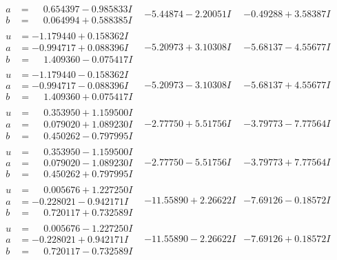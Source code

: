\documentclass[1p]{elsarticle_modified}
\theoremstyle{definition}
\begin{document}
$$\begin{array}{c|c|c}
\begin{aligned}
a &= \phantom{-}0.654397 - 0.985833 I \\
b &= \phantom{-}0.064994 + 0.588385 I\end{aligned}
 & -5.44874 - 2.20051 I & -0.49288 + 3.58387 I \\ \hline\begin{aligned}
u &= -1.179440 + 0.158362 I \\
a &= -0.994717 + 0.088396 I \\
b &= \phantom{-}1.409360 - 0.075417 I\end{aligned}
 & -5.20973 + 3.10308 I & -5.68137 - 4.55677 I \\ \hline\begin{aligned}
u &= -1.179440 - 0.158362 I \\
a &= -0.994717 - 0.088396 I \\
b &= \phantom{-}1.409360 + 0.075417 I\end{aligned}
 & -5.20973 - 3.10308 I & -5.68137 + 4.55677 I \\ \hline\begin{aligned}
u &= \phantom{-}0.353950 + 1.159500 I \\
a &= \phantom{-}0.079020 + 1.089230 I \\
b &= \phantom{-}0.450262 - 0.797995 I\end{aligned}
 & -2.77750 + 5.51756 I & -3.79773 - 7.77564 I \\ \hline\begin{aligned}
u &= \phantom{-}0.353950 - 1.159500 I \\
a &= \phantom{-}0.079020 - 1.089230 I \\
b &= \phantom{-}0.450262 + 0.797995 I\end{aligned}
 & -2.77750 - 5.51756 I & -3.79773 + 7.77564 I \\ \hline\begin{aligned}
u &= \phantom{-}0.005676 + 1.227250 I \\
a &= -0.228021 - 0.942171 I \\
b &= \phantom{-}0.720117 + 0.732589 I\end{aligned}
 & -11.55890 + 2.26622 I & -7.69126 - 0.18572 I \\ \hline\begin{aligned}
u &= \phantom{-}0.005676 - 1.227250 I \\
a &= -0.228021 + 0.942171 I \\
b &= \phantom{-}0.720117 - 0.732589 I\end{aligned}
 & -11.55890 - 2.26622 I & -7.69126 + 0.18572 I \\ \hline\begin{aligned}

\end{aligned}
\end{array}$$
\end{document}
